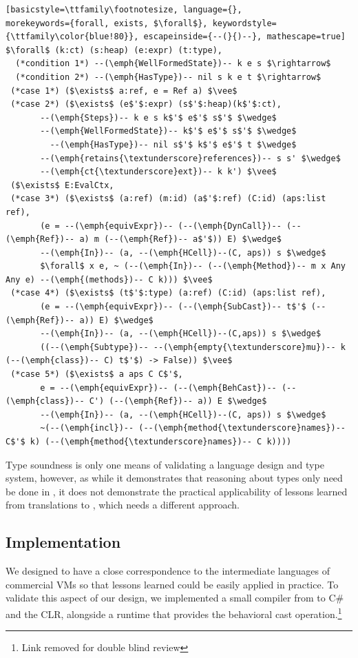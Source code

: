 \documentclass[a4paper,USenglish]{tex/lipics-v2016}
\begin{document}
\begin{lstlisting}[basicstyle=\ttfamily\footnotesize, language={}, 
morekeywords={forall, exists, $\forall$}, keywordstyle={\ttfamily\color{blue!80}}, escapeinside={--(}{)--}, mathescape=true]
$\forall$ (k:ct) (s:heap) (e:expr) (t:type),
  (*condition 1*) --(\emph{WellFormedState})-- k e s $\rightarrow$ 
  (*condition 2*) --(\emph{HasType})-- nil s k e t $\rightarrow$   
 (*case 1*) ($\exists$ a:ref, e = Ref a) $\vee$
 (*case 2*) ($\exists$ (e$'$:expr) (s$'$:heap)(k$'$:ct), 
       --(\emph{Steps})-- k e s k$'$ e$'$ s$'$ $\wedge$
       --(\emph{WellFormedState})-- k$'$ e$'$ s$'$ $\wedge$
	     --(\emph{HasType})-- nil s$'$ k$'$ e$'$ t $\wedge$
       --(\emph{retains{\textunderscore}references})-- s s' $\wedge$
       --(\emph{ct{\textunderscore}ext})-- k k') $\vee$
 ($\exists$ E:EvalCtx,
 (*case 3*) ($\exists$ (a:ref) (m:id) (a$'$:ref) (C:id) (aps:list ref),
       (e = --(\emph{equivExpr})-- (--(\emph{DynCall})-- (--(\emph{Ref})-- a) m (--(\emph{Ref})-- a$'$)) E) $\wedge$
       --(\emph{In})-- (a, --(\emph{HCell})--(C, aps)) s $\wedge$
       $\forall$ x e, ~ (--(\emph{In})-- (--(\emph{Method})-- m x Any Any e) --(\emph{(methods})-- C k))) $\vee$
 (*case 4*) ($\exists$ (t$'$:type) (a:ref) (C:id) (aps:list ref),
       (e = --(\emph{equivExpr})-- (--(\emph{SubCast})-- t$'$ (--(\emph{Ref})-- a)) E) $\wedge$
       --(\emph{In})-- (a, --(\emph{HCell})--(C,aps)) s $\wedge$
       ((--(\emph{Subtype})-- --(\emph{empty{\textunderscore}mu})-- k (--(\emph{class})-- C) t$'$) -> False)) $\vee$
 (*case 5*) ($\exists$ a aps C C$'$, 
       e = --(\emph{equivExpr})-- (--(\emph{BehCast})-- (--(\emph{class})-- C') (--(\emph{Ref})-- a)) E $\wedge$
       --(\emph{In})-- (a, --(\emph{HCell})--(C, aps)) s $\wedge$
       ~(--(\emph{incl})-- (--(\emph{method{\textunderscore}names})-- C$'$ k) (--(\emph{method{\textunderscore}names})-- C k))))
\end{lstlisting}

Type soundness is only one means of validating a language design and type
system, however, as while it demonstrates that reasoning about types only need
be done in \kafka, it does not demonstrate the practical applicability of 
lessons learned from translations to \kafka, which needs a different approach.

\subsection{Implementation} We designed \kafka to have a close correspondence
to the intermediate languages of commercial VMs so that lessons learned could
be easily applied in practice. To validate this aspect of our design, we
implemented a small compiler from \kafka to C\# and the CLR, alongside a
runtime that provides the behavioral cast operation.\footnote{Link removed for
double blind review}
\end{document}
